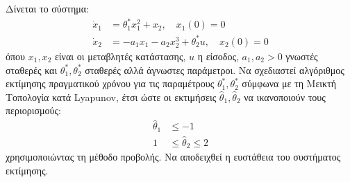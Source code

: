 \documentclass[a4paper,11pt]{article}
\begin{document}
\begin{question}
Δίνεται το σύστημα:
\begin{align}
    \dot{x}_1 &= \theta_1^* x_1^2 + x_2, \quad x_1(0) = 0 \\
    \dot{x}_2 &= -a_1 x_1 - a_2 x_2^3 + \theta_2^* u, \quad x_2(0) = 0
\end{align}
όπου $x_1, x_2$ είναι οι μεταβλητές κατάστασης, $u$ η είσοδος, $a_1, a_2 > 0$ γνωστές σταθερές και $\theta_1^*, \theta_2^*$ σταθερές αλλά άγνωστες παράμετροι. Να σχεδιαστεί αλγόριθμος εκτίμησης πραγματικού χρόνου για τις παραμέτρους $\theta_1^*, \theta_2^*$ σύμφωνα με τη Μεικτή Τοπολογία κατά Lyapunov, έτσι ώστε οι εκτιμήσεις $\hat{\theta}_1, \hat{\theta}_2$ να ικανοποιούν τους περιορισμούς:
\begin{align}
    \hat{\theta}_1 &\le -1 \\
    1 &\le \hat{\theta}_2 \le 2
\end{align}
χρησιμοποιώντας τη μέθοδο προβολής. Να αποδειχθεί η ευστάθεια του συστήματος εκτίμησης.
\end{question}
\end{document}
